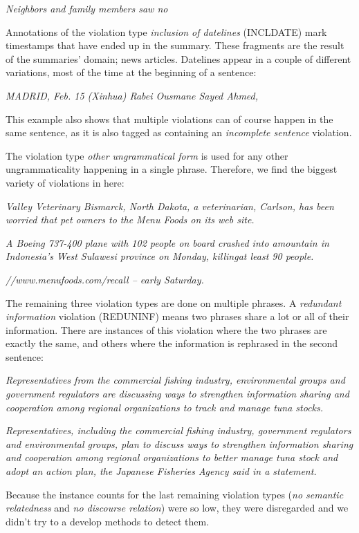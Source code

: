 \documentclass[a4paper,10pt]{scrartcl}
\theoremstyle{style}
\begin{document}
\quad\textit{Neighbors and family members saw no}

Annotations of the violation type \textit{inclusion of datelines} (INCLDATE) mark timestamps that have ended up in the summary. These fragments are the result of the summaries' domain; news articles. Datelines appear in a couple of different variations, most of the time at the beginning of a sentence:

\quad\textit{MADRID, Feb. 15 (Xinhua) Rabei Ousmane Sayed Ahmed,}

This example also shows that multiple violations can of course happen in the same sentence, as it is also tagged as containing an \textit{incomplete sentence} violation.

The violation type \textit{other ungrammatical form} is used for any other ungrammaticality happening in a single phrase. Therefore, we find the biggest variety of violations in here:

\quad\textit{Valley Veterinary Bismarck, North Dakota, a veterinarian, Carlson, has been worried that pet owners to the Menu Foods on its web site.}

\quad\textit{A Boeing 737-400 plane with 102 people on board crashed into amountain in Indonesia's West Sulawesi province on Monday, killingat least 90 people.}

\quad\textit{//www.menufoods.com/recall -- early Saturday.}

The remaining three violation types are done on multiple phrases. A \textit{redundant information} violation (REDUNINF) means two phrases share a lot or all of their information. There are instances of this violation where the two phrases are exactly the same, and others where the information is rephrased in the second sentence:

\quad\textit{Representatives from the commercial fishing industry, environmental groups and government regulators are discussing ways to strengthen information sharing and cooperation among regional organizations to track and manage tuna stocks.}

\quad\textit{Representatives, including the commercial fishing industry, government regulators and environmental groups, plan to discuss ways to strengthen information sharing and cooperation among regional organizations to better manage tuna stock and adopt an action plan, the Japanese Fisheries Agency said in a statement.}

Because the instance counts for the last remaining violation types (\textit{no semantic relatedness} and \textit{no discourse relation}) were so low, they were disregarded and we didn't try to a develop methods to detect them.
\end{document}
